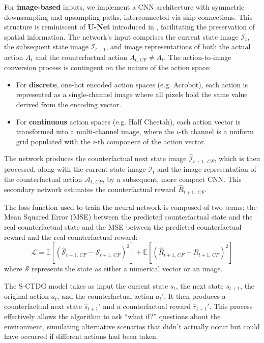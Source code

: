 For \textbf{image-based} inputs, we implement a CNN
architecture with symmetric downsampling and upsampling paths,
interconnected via skip connections. This structure is reminiscent
of \textbf{U-Net} introduced in \cite{ronneberger2015u},
facilitating the preservation of
spatial information.
The network's input comprises the current state image $\mathcal{I}_{t}$,
the subsequent state image $\mathcal{I}_{t+1}$,
and image representations of both the actual action $A_t$
and the counterfactual action $A_{t,\, CF} \neq A_t$. The action-to-image
conversion process is contingent on the nature of the action space:
\begin{itemize}
    \item For \textbf{discrete}, one-hot encoded action spaces (e.g. Acrobot),
    each action is represented as a single-channel image where all
    pixels hold the same value derived from the encoding vector.
    \item For \textbf{continuous} action spaces (e.g. Half Cheetah), 
    each action vector is transformed into a multi-channel image,
    where the $i$-th channel is a uniform grid populated with the
    $i$-th component of the action vector.
\end{itemize}
The network produces the counterfactual next state image
$\hat{\mathcal{I}}_{t+1,\; CF}$, which
is then processed, along with the current state image
$\mathcal{I}_{t}$ and the image representation of the counterfactual
action $\mathcal{A}_{t,\, CF}$, by a subsequent, more compact CNN.
This secondary network estimates the counterfactual reward $\hat{R}_{t+1,\; CF}$.

The loss function used to train the neural network is composed of
two terms: the Mean Squared Error (MSE) between the predicted
counterfactual state and the real counterfactual state and the
MSE between the predicted counterfactual reward and the real
counterfactual reward:
\begin{equation}
    \mathcal{L} = \mathbb{E} \left[ \left( \hat{\mathcal{S}}_{t+1,\, CF} - \mathcal{S}_{t+1,\, CF} \right)^2 \right] +
    \mathbb{E} \left[ \left( \hat{R}_{t+1,\, CF} - R_{t+1,\, CF} \right)^2 \right]
\end{equation}
where $\mathcal{S}$ represents the state as either a numerical vector
or an image.

The S-CTDG model takes as input the current state $s_t$,
the next state $s_{t+1}$, the original action $a_t$,
and the counterfactual action $a_t'$. It then produces a counterfactual
next state $\hat{s}_{t+1}'$ and a counterfactual reward $\hat{r}_{t+1}'$.
This process effectively allows the algorithm to ask ``what if?''
questions about the environment, simulating alternative scenarios
that didn't actually occur but could have occurred if different actions
had been taken. 

